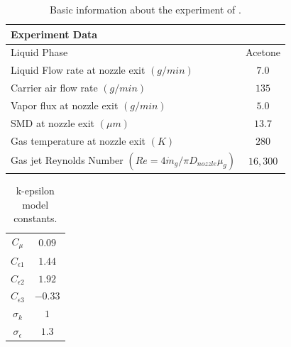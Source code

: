 \documentclass[preprint,12pt,review]{elsarticle}
\begin{document}



\nocite{*}






\newpage
\listoffigures

\newpage

\begin{table}
\centering
 \begin{tabular}{lc}
\hline
Experiment  Data & \\ \hline
Liquid Phase & Acetone \\
Liquid Flow rate at nozzle exit $(g/min)$  &  $7.0$ \\
Carrier air flow rate $(g/min)$ & $135$ \\
Vapor flux at nozzle exit $(g/min)$ & $5.0$ \\
SMD at nozzle exit $(\mu m)$ & $13.7$ \\
Gas temperature at nozzle exit $(K)$ & $280$ \\ 
Gas jet Reynolds Number $(Re=4 \dot{m}_g/\pi D_{nozzle} \mu_g)$ & $16,300$ \\
\hline
 \end{tabular}
\caption{Basic information about the experiment of \citet{chen}.}
\label{table: exp}
\end{table} 

\begin{table}
\centering
 \begin{tabular}{cc}
  \hline
  $C_{\mu}$ & $0.09$ \\
  $C_{\epsilon 1}$ & $1.44$ \\
  $C_{\epsilon 2}$ & $1.92$ \\
  $C_{\epsilon 3}$ & $-0.33$ \\
  $\sigma_k$ & $1$ \\
  $\sigma_{\epsilon}$ & $1.3$ \\ \hline
 \end{tabular}
\caption{k-epsilon model constants.}
\label{table: kepscoeff}
\end{table} 
\end{document}
